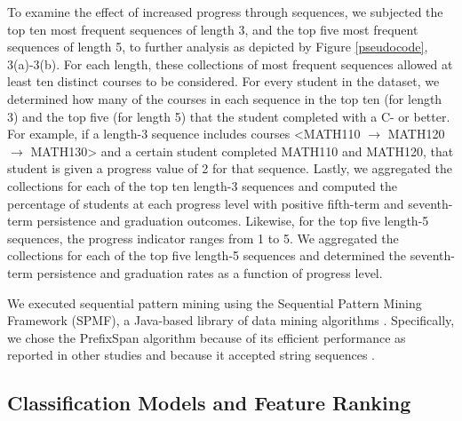 \documentclass[conference]{IEEEtran}
\begin{document}
To examine the effect of increased progress through sequences, we subjected the top ten most frequent sequences of length 3, and the top five most frequent sequences of length 5, to further analysis as depicted by Figure \ref{pseudocode}, 3(a)-3(b).  For each length, these collections of most frequent sequences allowed at least ten distinct courses to be considered.  For every student in the dataset, we determined how many of the courses in each sequence in the top ten (for length 3) and the top five (for length 5) that the student completed with a C- or better.  For example, if a length-3 sequence includes courses \textless MATH110 $\rightarrow$ MATH120 $\rightarrow$ MATH130\textgreater{} and a certain student completed MATH110 and MATH120, that student is given a progress value of 2 for that sequence.  Lastly, we aggregated the collections for each of the top ten length-3 sequences and computed the percentage of students at each progress level with positive fifth-term and seventh-term persistence and graduation outcomes.  Likewise, for the top five length-5 sequences, the progress indicator ranges from 1 to 5.  We aggregated the collections for each of the top five length-5 sequences and determined the seventh-term persistence and graduation rates as a function of progress level.

We executed sequential pattern mining using the Sequential Pattern Mining Framework (SPMF), a Java-based library of data mining algorithms \cite{Viger}.  Specifically, we chose the PrefixSpan algorithm because of its efficient performance as reported in other studies \cite{Pei, Maylawati} and because it accepted string sequences \cite{Viger_PrefixSpan}.

\subsection{Classification Models and Feature Ranking}
\label{feature_importance_subsection}
\end{document}
